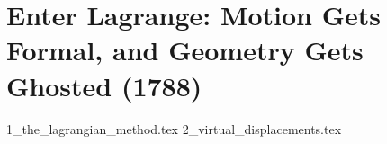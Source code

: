 \section{Enter Lagrange: Motion Gets Formal, and Geometry Gets Ghosted (1788)}


{1_the_lagrangian_method.tex}
{2_virtual_displacements.tex}